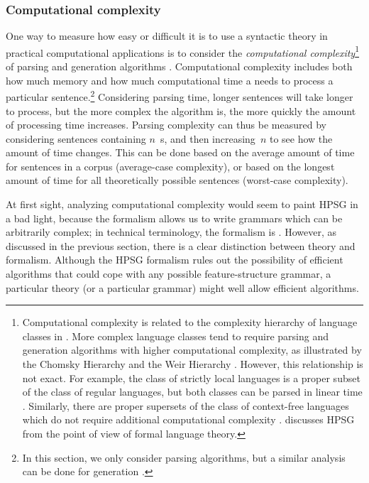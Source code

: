 \documentclass[output=paper,biblatex,babelshorthands,newtxmath,draftmode,colorlinks,citecolor=brown]{langscibook}
\begin{document}
\subsubsection{Computational complexity}
\label{cl:prac:comp}


One way to measure how easy or difficult it is
to use a syntactic theory in practical computational applications
is to consider the \textit{computational complexity}\footnote{%
	Computational complexity is related to
	the complexity hierarchy of language classes in .
	More complex language classes tend to require
	parsing and generation algorithms with higher computational complexity,
	as illustrated by the Chomsky Hierarchy \citep{Chomsky63a-u,hopcroft1969automata}
	and the Weir Hierarchy \citep{weir1992hierarchy}.
	However, this relationship is not exact.
	For example, the class of strictly local languages is a proper subset of the class of regular languages,
	but both classes can be parsed in linear time \citep{jaeger2012hierarchy}.
	Similarly, there are proper supersets of the class of context-free languages
	which do not require additional computational complexity \citep{boullier1999cubic}.
	\citet[Chapter 17]{MuellerGT-Eng3} discusses HPSG from the point of view of formal language theory.
}
of parsing and generation algorithms \citep{gazdar1985complexity}.
Computational complexity includes both how much memory
and how much computational time
a  needs to process a particular sentence.\footnote{%
  In this section, we only consider parsing
  algorithms, but a similar analysis can be done for generation
  \citep[\eg][]{carroll1999generate}.}
Considering parsing time, longer sentences will take longer to process,
but the more complex the algorithm is,
the more quickly the amount of processing time increases.
Parsing complexity can thus be measured by considering
sentences containing $n$~s,
and then increasing~$n$ to see how the amount of time changes.
This can be done based on the average amount of time
for sentences in a corpus (average-case complexity),
or based on the longest amount of time
for all theoretically possible sentences (worst-case complexity).

At first sight, analyzing computational complexity
would seem to paint HPSG in a bad light,
because the formalism allows us to write grammars
which can be arbitrarily complex;
in technical terminology, the formalism is \textit{}
\citep[Section~3.4]{Johnson88}.
However, as discussed in the previous section,
there is a clear distinction between theory and formalism.
Although the HPSG formalism rules out the possibility of efficient algorithms
that could cope with any possible feature-structure grammar,
a particular theory (or a particular grammar) might well allow efficient algorithms.
\end{document}
